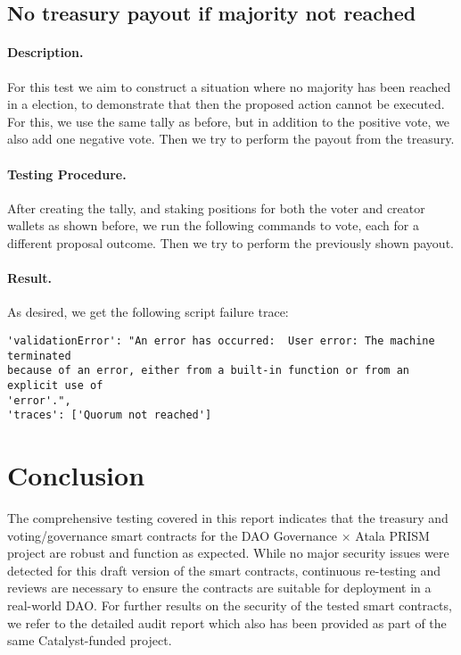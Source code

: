\documentclass[11pt]{article}
\begin{document}
\subsection{No treasury payout if majority not reached}

\paragraph{Description.} For this test we aim to construct a situation where no majority has been reached in a election, to demonstrate that then the proposed action cannot be executed. For this, we use the same tally as before, but in addition to the positive vote, we also add one negative vote. Then we try to perform the payout from the treasury.

\paragraph{Testing Procedure.} After creating the tally, and staking positions for both the voter and creator wallets as shown before, we run the following commands to vote, each for a different proposal outcome. Then we try to perform the previously shown payout.

\paragraph{Result.} As desired, we get the following script failure trace:
\begin{verbatim}
'validationError': "An error has occurred:  User error: The machine terminated
because of an error, either from a built-in function or from an explicit use of
'error'.",
'traces': ['Quorum not reached']
\end{verbatim}


\section{Conclusion}

The comprehensive testing covered in this report indicates that the treasury and voting/governance smart contracts for the DAO Governance × Atala PRISM project are robust and function as expected. While no major security issues were detected for this draft version of the smart contracts, continuous re-testing and reviews are necessary to ensure the contracts are suitable for deployment in a real-world DAO. For further results on the security of the tested smart contracts, we refer to the detailed audit report which also has been provided as part of the same Catalyst-funded project.
\end{document}
